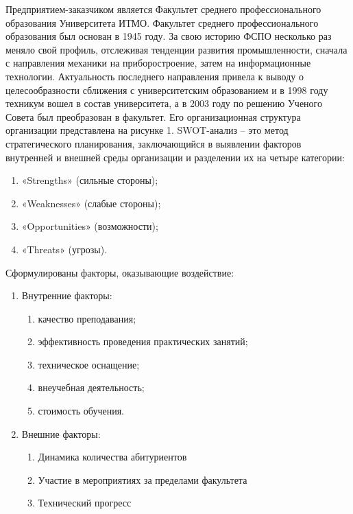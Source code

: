 
\mainText

Предприятием-заказчиком является Факультет среднего профессионального образования Университета ИТМО. Факультет среднего профессионального образования был основан в 1945 году. За свою историю ФСПО несколько раз меняло свой профиль, отслеживая тенденции развития промышленности, сначала с направления механики на приборостроение, затем на информационные технологии. Актуальность последнего направления привела к выводу о целесообразности сближения с университетским образованием и в 1998 году техникум вошел в состав университета, а в 2003 году по решению Ученого Совета был преобразован в факультет. Его организационная структура организации представлена на рисунке 1.
SWOT-анализ – это метод стратегического планирования, заключающийся в выявлении факторов внутренней и внешней среды организации и разделении их на четыре категории:
\begin{enumerate}
	\gostEnum
	\item «Strengths» (сильные стороны);
	\item «Weaknesses» (слабые стороны);
	\item «Opportunities» (возможности);
	\item «Threats» (угрозы).
\end{enumerate}

Сформулированы факторы, оказывающие воздействие:
\par
\begin{enumerate}
	\gostEnumPriority
	\item	Внутренние факторы:
	\begin{enumerate}
		\gostEnumPriority
		\item качество преподавания;
		\item эффективность проведения практических занятий;
		\item техническое оснащение;
		\item внеучебная деятельность;
		\item стоимость обучения.		
	\end{enumerate}
	\item Внешние факторы:
	\begin{enumerate}
		\gostEnumPriority
		\item Динамика количества абитуриентов
		\item Участие в мероприятиях за пределами факультета
		\item Технический прогресс
	\end{enumerate}

\end{enumerate}

